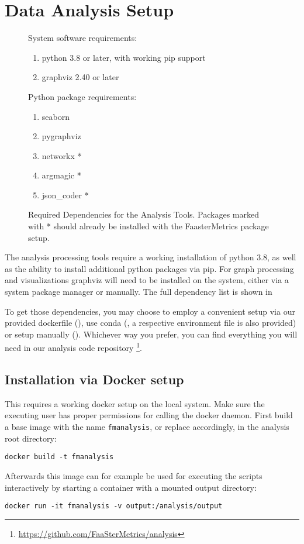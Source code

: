 \documentclass[../main.tex]{subfiles}
\begin{document}
\section{Data Analysis Setup}\label{sec:analysisSetup}

\begin{figure}
  System software requirements:
  \begin{enumerate}
    \item python 3.8 or later, with working pip support
    \item graphviz 2.40 or later
  \end{enumerate}
  Python package requirements:
  \begin{enumerate}
    \item seaborn
    \item pygraphviz
    \item networkx *
    \item argmagic *
    \item json\_coder *
  \end{enumerate}
  \caption[Required Dependencies for the Analysis Tools]%
  {Required Dependencies for the Analysis Tools. 
  Packages marked with * should already be installed with the FaasterMetrics package setup.}%
  \label{fig:analysisRequiredSetupTools}
\end{figure}


The analysis processing tools require a working installation of python 3.8, 
as well as the ability to install additional python packages via pip. 
For graph processing and visualizations graphviz will need to be installed on the system, 
either via a system package manager or manually. 
The full dependency list is shown in 

To get those dependencies, you may choose to employ a convenient setup via our provided dockerfile (),
use conda (, a respective environment file is also provided) or setup manually ().
Whichever way you prefer, you can find everything you will need in our analysis code repository%
\footnote{\url{https://github.com/FaaSterMetrics/analysis}}.

\subsection{Installation via Docker setup}%
\label{sub:analysisDockerSetup}

This requires a working docker setup on the local system. 
Make sure the executing user has proper permissions for calling the docker daemon.
First build a base image with the name \texttt{fmanalysis}, or replace accordingly, in the analysis root directory:
\begin{tcolorbox}
  \texttt{docker build -t fmanalysis}
\end{tcolorbox}\noindent
Afterwards this image can for example be used for executing the scripts interactively by starting a container with a mounted output directory:
\begin{tcolorbox}
  \texttt{docker run -it fmanalysis -v output:/analysis/output}
\end{tcolorbox}
\end{document}

